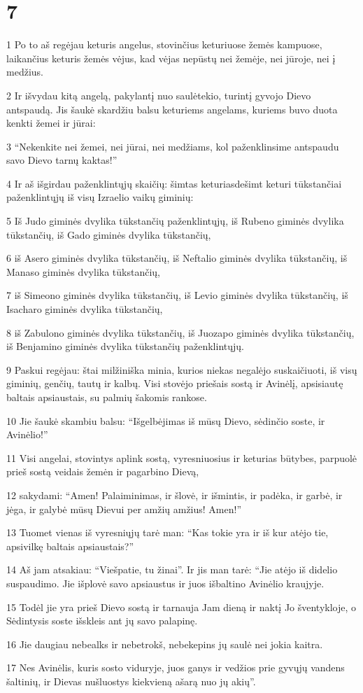 \chapter{7}


\par 1 Po to aš regėjau keturis angelus, stovinčius keturiuose žemės kampuose, laikančius keturis žemės vėjus, kad vėjas nepūstų nei žemėje, nei jūroje, nei į medžius. 
\par 2 Ir išvydau kitą angelą, pakylantį nuo saulėtekio, turintį gyvojo Dievo antspaudą. Jis šaukė skardžiu balsu keturiems angelams, kuriems buvo duota kenkti žemei ir jūrai: 
\par 3 “Nekenkite nei žemei, nei jūrai, nei medžiams, kol paženklinsime antspaudu savo Dievo tarnų kaktas!” 
\par 4 Ir aš išgirdau paženklintųjų skaičių: šimtas keturiasdešimt keturi tūkstančiai paženklintųjų iš visų Izraelio vaikų giminių: 
\par 5 Iš Judo giminės dvylika tūkstančių paženklintųjų, iš Rubeno giminės dvylika tūkstančių, iš Gado giminės dvylika tūkstančių, 
\par 6 iš Asero giminės dvylika tūkstančių, iš Neftalio giminės dvylika tūkstančių, iš Manaso giminės dvylika tūkstančių, 
\par 7 iš Simeono giminės dvylika tūkstančių, iš Levio giminės dvylika tūkstančių, iš Isacharo giminės dvylika tūkstančių, 
\par 8 iš Zabulono giminės dvylika tūkstančių, iš Juozapo giminės dvylika tūkstančių, iš Benjamino giminės dvylika tūkstančių paženklintųjų. 
\par 9 Paskui regėjau: štai milžiniška minia, kurios niekas negalėjo suskaičiuoti, iš visų giminių, genčių, tautų ir kalbų. Visi stovėjo priešais sostą ir Avinėlį, apsisiautę baltais apsiaustais, su palmių šakomis rankose. 
\par 10 Jie šaukė skambiu balsu: “Išgelbėjimas iš mūsų Dievo, sėdinčio soste, ir Avinėlio!” 
\par 11 Visi angelai, stovintys aplink sostą, vyresniuosius ir keturias būtybes, parpuolė prieš sostą veidais žemėn ir pagarbino Dievą, 
\par 12 sakydami: “Amen! Palaiminimas, ir šlovė, ir išmintis, ir padėka, ir garbė, ir jėga, ir galybė mūsų Dievui per amžių amžius! Amen!” 
\par 13 Tuomet vienas iš vyresniųjų tarė man: “Kas tokie yra ir iš kur atėjo tie, apsivilkę baltais apsiaustais?” 
\par 14 Aš jam atsakiau: “Viešpatie, tu žinai”. Ir jis man tarė: “Jie atėjo iš didelio suspaudimo. Jie išplovė savo apsiaustus ir juos išbaltino Avinėlio kraujyje. 
\par 15 Todėl jie yra prieš Dievo sostą ir tarnauja Jam dieną ir naktį Jo šventykloje, o Sėdintysis soste išskleis ant jų savo palapinę. 
\par 16 Jie daugiau nebealks ir nebetrokš, nebekepins jų saulė nei jokia kaitra. 
\par 17 Nes Avinėlis, kuris sosto viduryje, juos ganys ir vedžios prie gyvųjų vandens šaltinių, ir Dievas nušluostys kiekvieną ašarą nuo jų akių”.


